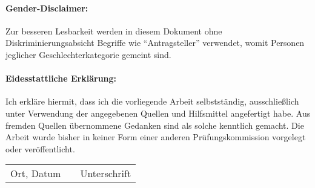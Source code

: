 \paragraph{Gender-Disclaimer:} Zur besseren Lesbarkeit werden in diesem Dokument ohne Diskriminierungsabsicht Begriffe wie ``Antragsteller'' verwendet, womit Personen jeglicher Geschlechterkategorie gemeint sind.\\[2cm]

\paragraph{Eidesstattliche Erklärung:} Ich erkläre hiermit, dass ich die vorliegende Arbeit selbstständig, ausschließlich unter Verwendung der angegebenen Quellen und Hilfsmittel angefertigt habe. Aus fremden Quellen übernommene Gedanken sind als solche kenntlich gemacht. Die Arbeit wurde bisher in keiner Form einer anderen Prüfungskommission vorgelegt oder veröffentlicht.\\[1cm]

\begin{table}[H]
	\centering
	\begin{tabular}{p{5cm}p{5cm}r}
		\hline
		Ort, Datum & \hspace*{5cm} & Unterschrift
	\end{tabular}
\end{table}
